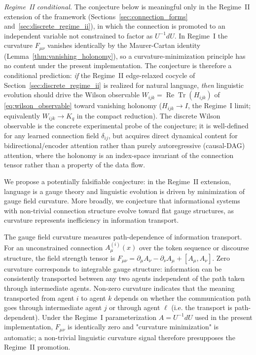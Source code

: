 \documentclass[11pt]{article}
\begin{document}
\emph{Regime~II conditional.} The conjecture below is meaningful only in the Regime~II extension of the framework (Sections~\ref{sec:connection_forms} and~\ref{sec:discrete_regime_ii}), in which the connection is promoted to an independent variable not constrained to factor as $U^{-1}dU$. In Regime~I the curvature $F_{\mu\nu}$ vanishes identically by the Maurer-Cartan identity (Lemma~\ref{thm:vanishing_holonomy}), so a curvature-minimization principle has no content under the present implementation. The conjecture is therefore a conditional prediction: \emph{if} the Regime~II edge-relaxed cocycle of Section~\ref{sec:discrete_regime_ii} is realized for natural language, \emph{then} linguistic evolution should drive the Wilson observable $W_{ijk} = \operatorname{Re}\operatorname{Tr}(H_{ijk})$ of \eqref{eq:wilson_observable} toward vanishing holonomy ($H_{ijk} \to I$, the Regime~I limit; equivalently $W_{ijk} \to K_q$ in the compact reduction). The discrete Wilson observable is the concrete experimental probe of the conjecture; it is well-defined for any learned connection field $\delta_{ij}$, but acquires direct dynamical content for bidirectional/encoder attention rather than purely autoregressive (causal-DAG) attention, where the holonomy is an index-space invariant of the connection tensor rather than a property of the data flow.

We propose a potentially falsifiable conjecture: in the Regime~II extension, language is a gauge theory and linguistic evolution is driven by minimization of gauge field curvature. More broadly, we conjecture that informational systems with non-trivial connection structure evolve toward flat gauge structures, as curvature represents inefficiency in information transport.

The gauge field curvature measures path-dependence of information transport. For an unconstrained connection $A_\mu^{(i)}(x)$ over the token sequence or discourse structure, the field strength tensor is $F_{\mu\nu} = \partial_\mu A_\nu - \partial_\nu A_\mu + [A_\mu, A_\nu]$. Zero curvature corresponds to integrable gauge structure: information can be consistently transported between any two agents independent of the path taken through intermediate agents. Non-zero curvature indicates that the meaning transported from agent $i$ to agent $k$ depends on whether the communication path goes through intermediate agent $j$ or through agent $\ell$ (i.e. the transport is path-dependent). Under the Regime~I parameterization $A = U^{-1}dU$ used in the present implementation, $F_{\mu\nu}$ is identically zero and "curvature minimization" is automatic; a non-trivial linguistic curvature signal therefore presupposes the Regime~II promotion.
\end{document}
